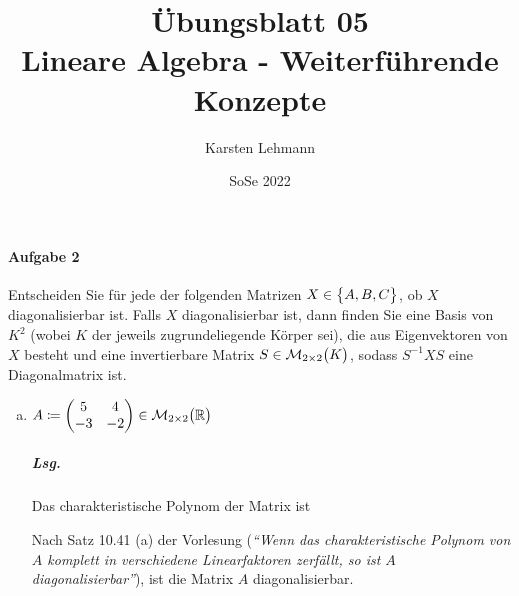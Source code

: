 \documentclass{scrreprt}
\author{Karsten Lehmann}
\date{SoSe 2022}
\title{Übungsblatt 05\\Lineare Algebra - Weiterführende Konzepte}
\begin{document}
\paragraph{Aufgabe 2} Entscheiden Sie für jede der folgenden Matrizen
$X \in \qty\big{A, B, C}$, ob $X$ diagonalisierbar ist.
Falls $X$ diagonalisierbar ist, dann finden Sie eine Basis von $K^2$
(wobei $K$ der jeweils zugrundeliegende Körper sei), die aus Eigenvektoren
von $X$ besteht und eine invertierbare Matrix
$S \in \mathcal{M}_{2 \times 2}\qty\big(K)$, sodass $S^{-1}XS$ eine
Diagonalmatrix ist.

\begin{enumerate}[(a)]
\item $A \coloneqq \begin{pmatrix}
    5 & 4 \\
    -3 & -2 \\
  \end{pmatrix} \in \mathcal{M}_{2 \times 2}\qty\big(\mathbb{R})$

  \subparagraph{Lsg.} Das charakteristische Polynom der Matrix ist
  Nach Satz 10.41 (a) der Vorlesung (\emph{``Wenn das charakteristische
    Polynom von $A$ komplett in verschiedene Linearfaktoren zerfällt, so ist
    $A$ diagonalisierbar''}), ist die Matrix $A$ diagonalisierbar.


\end{enumerate}
\end{document}
